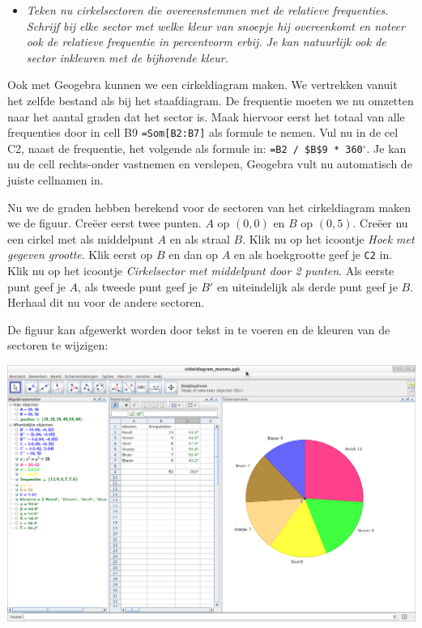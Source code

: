\documentclass[11pt]{article}
\newcommand{\vraag}[2]{\begin{itemize}\item {\it #1} \vspace*{#2}\end{itemize}}
\newcommand{\degree}{\ensuremath{^\circ}}
\begin{document}
\vraag{Teken nu cirkelsectoren die overeenstemmen met de relatieve frequenties. Schrijf bij elke
sector met welke kleur van snoepje hij overeenkomt en noteer ook de relatieve frequentie in
percentvorm erbij. Je kan natuurlijk ook de sector inkleuren met de bijhorende kleur.}{2cm}

\begin{center}
  
\end{center}

Ook met Geogebra kunnen we een cirkeldiagram maken. We vertrekken vanuit het zelfde bestand als bij
het staafdiagram. De frequentie moeten we nu omzetten naar het aantal graden dat het sector is. Maak
hiervoor eerst het totaal van alle frequenties door in cell B9 \verb$=Som[B2:B7]$ als formule te nemen.
Vul nu in de cel C2, naast de frequentie, het volgende als formule in: \verb#=B2 / $B$9 * 360#$\degree$.
Je kan nu de cell rechts-onder vastnemen en verslepen, Geogebra vult nu automatisch de juiste cellnamen in.

Nu we de graden hebben berekend voor de sectoren van het cirkeldiagram maken we de figuur. Creëer eerst twee punten. $A$ op $(0,0)$ en $B$ op $(0,5)$. Creëer nu een cirkel met als middelpunt $A$ en als straal $B$. Klik nu op het icoontje {\it Hoek met gegeven grootte}. Klik eerst op $B$ en dan op $A$ en als hoekgrootte geef je \verb$C2$ in. Klik nu op het icoontje {\it Cirkelsector met middelpunt door 2 punten}. Als eerste punt geef je $A$, als tweede punt geef je $B'$ en uiteindelijk als derde punt geef je $B$. Herhaal dit nu voor de andere sectoren.

De figuur kan afgewerkt worden door tekst in te voeren en de kleuren van de sectoren te wijzigen:
\begin{center}
  \includegraphics[width=14cm]{gg-cirkeldiagram_menms}
\end{center}
\end{document}
